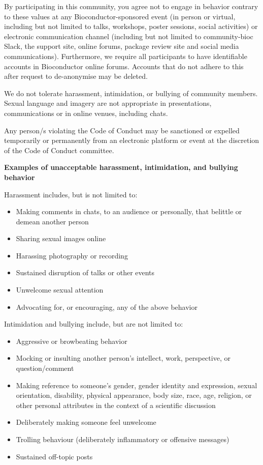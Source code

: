\documentclass[
  oneside]{book}
\providecommand{\tightlist}{%
  \setlength{\itemsep}{0pt}\setlength{\parskip}{0pt}}
\begin{document}
By participating in this community, you agree not to engage in behavior contrary to these values at any Bioconductor-sponsored event (in person or virtual, including but not limited to talks, workshops, poster sessions, social activities) or electronic communication channel (including but not limited to community-bioc Slack, the support site, online forums, package review site and social media communications). Furthermore, we require all participants to have identifiable accounts in Bioconductor online forums. Accounts that do not adhere to this after request to de-anonymise may be deleted.

We do not tolerate harassment, intimidation, or bullying of community members. Sexual language and imagery are not appropriate in presentations, communications or in online venues, including chats.

Any person/s violating the Code of Conduct may be sanctioned or expelled temporarily or permanently from an electronic platform or event at the discretion of the Code of Conduct committee.

\textbf{Examples of unacceptable harassment, intimidation, and bullying behavior}

Harassment includes, but is not limited to:

\begin{itemize}
\tightlist
\item
  Making comments in chats, to an audience or personally, that belittle or demean another person
\item
  Sharing sexual images online
\item
  Harassing photography or recording
\item
  Sustained disruption of talks or other events
\item
  Unwelcome sexual attention
\item
  Advocating for, or encouraging, any of the above behavior
\end{itemize}

Intimidation and bullying include, but are not limited to:

\begin{itemize}
\tightlist
\item
  Aggressive or browbeating behavior
\item
  Mocking or insulting another person's intellect, work, perspective, or question/comment
\item
  Making reference to someone's gender, gender identity and expression, sexual orientation, disability, physical appearance, body size, race, age, religion, or other personal attributes in the context of a scientific discussion
\item
  Deliberately making someone feel unwelcome
\item
  Trolling behaviour (deliberately inflammatory or offensive messages)
\item
  Sustained off-topic posts
\end{itemize}
\end{document}
